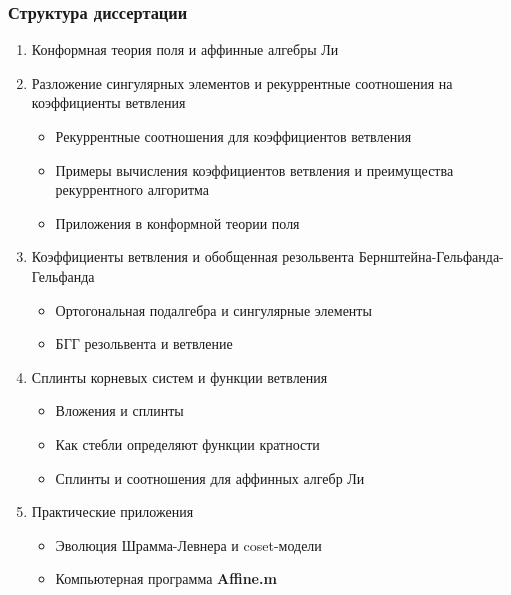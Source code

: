 \documentclass[pdftex]{beamer}
\theoremstyle{definition} \newtheorem{Def}{Определение}
\begin{document}
\begin{frame}
  \frametitle{Структура диссертации}
  \begin{enumerate}
  \item Конформная теория поля и аффинные алгебры Ли
  \item Разложение сингулярных элементов и рекуррентные соотношения на коэффициенты ветвления
    \begin{itemize}
    \item Рекуррентные соотношения для коэффициентов ветвления
    \item Примеры вычисления коэффициентов ветвления и преимущества рекуррентного алгоритма
    \item Приложения в конформной теории поля
    \end{itemize}
  \item Коэффициенты ветвления и обобщенная резольвента Бернштейна-Гельфанда-Гельфанда
    \begin{itemize}
    \item Ортогональная подалгебра и сингулярные элементы
    \item БГГ резольвента и ветвление
    \end{itemize}
  \item Сплинты корневых систем и функции ветвления
    \begin{itemize}
    \item Вложения и сплинты
    \item Как стебли определяют функции кратности
    \item Сплинты и соотношения для аффинных алгебр Ли
    \end{itemize}

  \item Практические приложения
    \begin{itemize}
    \item Эволюция Шрамма-Левнера и coset-модели
    \item Компьютерная программа {\bf Affine.m}
    \end{itemize}
  \end{enumerate}
\end{frame}
\end{document}

